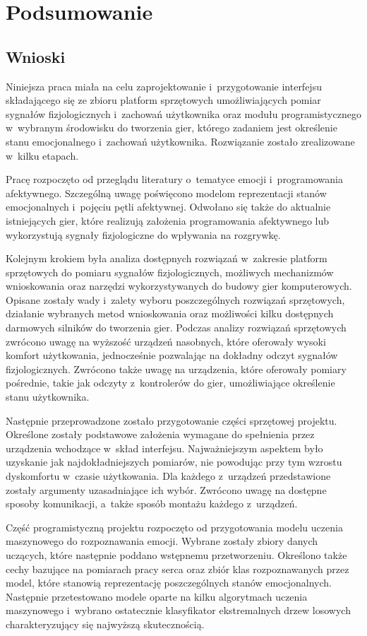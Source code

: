 \chapter{Podsumowanie}
\label{cha:podsumowanie}
\section{Wnioski}
Niniejsza praca miała na celu zaprojektowanie i~przygotowanie interfejsu składającego się ze zbioru platform sprzętowych umożliwiających pomiar sygnałów fizjologicznych i~zachowań użytkownika oraz modułu programistycznego w~wybranym środowisku do tworzenia gier, którego zadaniem jest określenie stanu emocjonalnego i~zachowań użytkownika. Rozwiązanie zostało zrealizowane w~kilku etapach.

Pracę rozpoczęto od przeglądu literatury o~tematyce emocji i~programowania afektywnego. Szczególną uwagę poświęcono modelom reprezentacji stanów emocjonalnych i~pojęciu pętli afektywnej. Odwołano się także do aktualnie istniejących gier, które realizują założenia programowania afektywnego lub wykorzystują sygnały fizjologiczne do wpływania na rozgrywkę.

Kolejnym krokiem była analiza dostępnych rozwiązań w~zakresie platform sprzętowych do pomiaru sygnałów fizjologicznych, możliwych mechanizmów wnioskowania oraz narzędzi wykorzystywanych do budowy gier komputerowych. Opisane zostały wady i~zalety wyboru poszczególnych rozwiązań sprzętowych, działanie wybranych metod wnioskowania oraz możliwości kilku dostępnych darmowych silników do tworzenia gier. Podczas analizy rozwiązań sprzętowych zwrócono uwagę na wyższość urządzeń nasobnych, które oferowały wysoki komfort użytkowania, jednocześnie pozwalając na dokładny odczyt sygnałów fizjologicznych. Zwrócono także uwagę na urządzenia, które oferowały pomiary pośrednie, takie jak odczyty z~kontrolerów do gier, umożliwiające określenie stanu użytkownika.

Następnie przeprowadzone zostało przygotowanie części sprzętowej projektu. Określone zostały podstawowe założenia wymagane do spełnienia przez urządzenia wchodzące w~skład interfejsu. Najważniejszym aspektem było uzyskanie jak najdokładniejszych pomiarów, nie powodując przy tym wzrostu dyskomfortu w~czasie użytkowania. Dla każdego z~urządzeń przedstawione zostały argumenty uzasadniające ich wybór. Zwrócono uwagę na dostępne sposoby komunikacji, a~także sposób montażu każdego z~urządzeń.

Część programistyczną projektu rozpoczęto od przygotowania modelu uczenia maszynowego do rozpoznawania emocji. Wybrane zostały zbiory danych uczących, które następnie poddano wstępnemu przetworzeniu. Określono także cechy bazujące na pomiarach pracy serca oraz zbiór klas rozpoznawanych przez model, które stanowią reprezentację poszczególnych stanów emocjonalnych. Następnie przetestowano modele oparte na kilku algorytmach uczenia maszynowego i~wybrano ostatecznie klasyfikator ekstremalnych drzew losowych charakteryzujący się najwyższą skutecznością.

